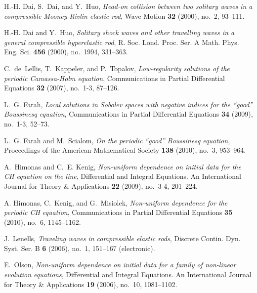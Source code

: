 \documentclass[12pt,reqno]{amsart}
\begin{document}
\begin{thebibliography}{dLKT07}
H.-H. Dai, S.~Dai, and Y.~Huo, \emph{{Head-on collision between two solitary
  waves in a compressible Mooney-Rivlin elastic rod}}, Wave Motion \textbf{32}
  (2000), no.~2, 93--111.

H.-H. Dai and Y.~Huo, \emph{{Solitary shock waves and other travelling waves in
  a general compressible hyperelastic rod}}, R. Soc. Lond. Proc. Ser. A Math.
  Phys. Eng. Sci. \textbf{456} (2000), no.~1994, 331--363.

C.~de~Lellis, T.~Kappeler, and P.~Topalov, \emph{{Low-regularity solutions of
  the periodic Camassa-Holm equation}}, Communications in Partial Differential
  Equations \textbf{32} (2007), no.~1-3, 87--126.

L.~G. Farah, \emph{{Local solutions in Sobolev spaces with negative indices for
  the ``good'' Boussinesq equation}}, Communications in Partial Differential
  Equations \textbf{34} (2009), no.~1-3, 52--73.

L.~G. Farah and M.~Scialom, \emph{{On the periodic ``good'' Boussinesq
  equation}}, Proceedings of the American Mathematical Society \textbf{138}
  (2010), no.~3, 953--964.

A.~Himonas and C.~E. Kenig, \emph{{Non-uniform dependence on initial data for
  the CH equation on the line}}, Differential and Integral Equations. An
  International Journal for Theory \& Applications \textbf{22} (2009),
  no.~3-4, 201--224.

A. Himonas, C.~Kenig, and G.~Misiolek, \emph{{Non-uniform dependence for
  the periodic CH equation}}, Communications in Partial Differential Equations
  \textbf{35} (2010), no.~6, 1145--1162.

J.~Lenells, \emph{{Traveling waves in compressible elastic rods}}, Discrete
  Contin. Dyn. Syst. Ser. B \textbf{6} (2006), no.~1, 151--167 (electronic).

E.~Olson, \emph{{Non-uniform dependence on initial data for a family of
  non-linear evolution equations}}, Differential and Integral Equations. An
  International Journal for Theory \& Applications \textbf{19} (2006),
  no.~10, 1081--1102.

\end{thebibliography}
%
%
\end{document}
